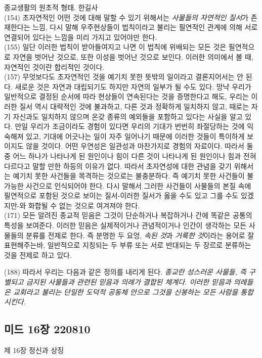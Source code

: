 \documentclass[11pt, a4paper]{article}
\begin{document}
종교생활의 원초적 형태. 한길사 \\
(154) 초자연적인 어떤 것에 대해 말할 수 있기 위해서는 \emph{사물들의 자연적인 질서}가 존재한다는 느낌, 다시 말해 우주현상들이 법칙이라고 불리는 필연적인 관계에 의해 서로 연결되어 있다는 느낌을 미리 가지고 있어야만 한다.  \\
(155) 일단 이러한 법칙이 받아들여지고 나면 이 법칙에 위배되는 모든 것은 필연적으로 자연을 벗어난 것으로, 또한 이성을 벗어난 것으로 보인다. 이러한 의미에서 볼 때, 자연적인 것이란 합리적인 것이다. \\
(157) 무엇보다도 초자연적인 것을 예기치 못한 뜻밖의 일이라고 결론지어서는 안 된다. 새로운 것은 자연과 대립되기도 하지만 자연의 일부가 될 수도 있다. 망냑 우리가 일반적으로 결정된 순서에 따라 현상들이 연속된다는 것을 증명한다고 해도, 우리는 이러한 질서 역시 대략적인 것에 불과하고, 다른 것과 정확하게 일치하지 않고, 때로는 자기 자신과도 일치하지 않으며 온갖 종류의 예외들을 포함하고 있다는 사실을 알고 있다. 만일 우리가 조금이라도 경험이 있다면 우리의 기대가 번번히 좌절당하는 것에 익숙해져 있고, 기대에 어긋나는 일이 자주 일어나기 때문에 이러한 것들이 특이하게 보이지도 않을 것이다. 어떤 우연성은 일관성과 마찬가지로 경험의 자료이다. 따라서 둘 중 어느 하나가 나타나게 된 원인이나 힘이 다른 것이 나타나게 된 원인이나 힘과 전혀 다르다고 말할 만한 하등의 이유가 없다. 따라서 초자연성에 대한 관념을 갖기 위해서는 예기치 못한 사건들을 목격하는 것으로는 불충분하다. 즉 예기치 못한 사건들이 불가능한 사건으로 인식되어야 한다. 다시 말해서 그러한 사건들이 사물들의 본질 속에 필연적으로 포함된 것으로 보이는 질서-이러한 질서가 옳을 수도 있고 그를 수도 있겠지만-와 화합될 수 없는 것으로 여겨져야 한다. \\

(171) 모든 알려진 종교적 믿음은 그것이 단순하거나 복잡하거나 간에 똑같은 공통의 특성을 보여준다. 이러한 믿음은 실제적이거나 관념적이거나 인간이 생각하는 모든 사물들의 분류를 전제로 한다. 즉 분명한 두 요엉, \emph{속된 것}과 \emph{거룩한 것}이라는 용어로 잘 표현해주는바, 일반적으로 지칭되는 두 부류 또는 서로 반대되는 두 장르로 분류하는 것을 전제로 하고 있다.

(188) 따라서 우리는 다음과 같은 정의를 내리게 된다. \emph{종교란 성스러운 사물들, 즉 구별되고 금지된 사물들과 관련된 믿음과 의례가 결합된 체계다. 이러한 믿음과 의례들은 교회라고 불리는 단일한 도덕적 공동체 안으로 그것을 신봉하는 모든 사람을 통합시킨다.}
\newpage
\subsection{미드 16장 220810}
제 16장 정신과 상징
\end{document}
